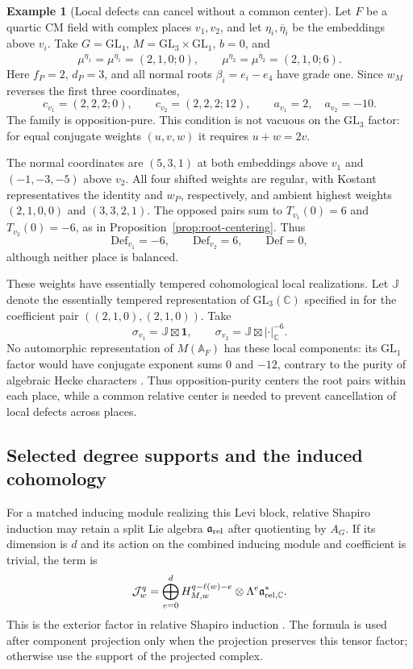 \documentclass[12pt]{amsart}
\numberwithin{equation}{section}
\theoremstyle{plain}
\theoremstyle{definition}
\newtheorem{example}[theorem]{Example}
\theoremstyle{remark}
\renewcommand{\bar}{\overline}
\newcommand{\C}{\mathbb C}
\newcommand{\GL}{\mathrm{GL}}
\newcommand{\Def}{\mathrm{Def}}
\begin{document}
\begin{example}[Local defects can cancel without a common center] \label{ex:defect-cancellation}
Let $F$ be a quartic CM field with complex places $v_1,v_2$, and let $\eta_i,\bar\eta_i$ be the embeddings above $v_i$. Take $G=\GL_4$, $M=\GL_3\times\GL_1$, $b=0$, and 
\[
 \mu^{\eta_1}=\mu^{\bar\eta_1}=(2,1,0;0),\qquad
 \mu^{\eta_2}=\mu^{\bar\eta_2}=(2,1,0;6).
\]
Here $f_P=2$, $d_P=3$, and all normal roots $\beta_i=e_i-e_4$ have grade one. Since $w_M$ reverses the first three coordinates, 
\[
 c_{v_1}=(2,2,2;0),\qquad c_{v_2}=(2,2,2;12),
 \qquad a_{v_1}=2,\quad a_{v_2}=-10.
\]
The family is opposition-pure. This condition is not vacuous on the $\GL_3$ factor: for equal conjugate weights $(u,v,w)$ it requires $u+w=2v$.

The normal coordinates are $(5,3,1)$ at both embeddings above $v_1$ and $(-1,-3,-5)$ above $v_2$. All four shifted weights are regular, with Kostant representatives the identity and $w_P$, respectively, and ambient highest weights $(2,1,0,0)$ and $(3,3,2,1)$. The opposed pairs sum to $T_{v_1}(0)=6$ and $T_{v_2}(0)=-6$, as in Proposition~\ref{prop:root-centering}. Thus 
\[
 \Def_{v_1}=-6,\qquad \Def_{v_2}=6,\qquad \Def=0,
\]
although neither place is balanced.

These weights have essentially tempered cohomological local realizations. Let $\mathbb J$ denote the essentially tempered representation of $\GL_3(\C)$ specified in \cite[(2.8)--(2.10), Prop.~2.13]{Raghuram2025} for the coefficient pair $((2,1,0),(2,1,0))$. Take 
\[
 \sigma_{v_1}=\mathbb J\boxtimes\mathbf1,\qquad
 \sigma_{v_2}=\mathbb J\boxtimes|\cdot|_{\C}^{-6}.
\]
No automorphic representation of $M(\mathbb A_F)$ has these local components: its $\GL_1$ factor would have conjugate exponent sums $0$ and $-12$, contrary to the purity of algebraic Hecke characters \cite[Lemma~17(ii)]{RaghuramHecke2022}. Thus opposition-purity centers the root pairs within each place, while a common relative center is needed to prevent cancellation of local defects across places.
\end{example}

\subsection{Selected degree supports and the induced cohomology}

For a matched inducing module realizing this Levi block, relative Shapiro induction may retain a split Lie algebra $\mathfrak a_{\rm rel}$ after quotienting by $A_G$. If its dimension is $d$ and its action on the combined inducing module and coefficient is trivial, the term is
\begin{equation}\label{eq:induced-piece}
 \mathcal J_w^q=\bigoplus_{e=0}^d
 H_{M,w}^{q-\ell(w)-e}\otimes
 \Lambda^e\mathfrak a_{{\rm rel},\C}^*.
\end{equation}
This is the exterior factor in relative Shapiro induction \cite[Ch.~III, Prop.~2.5(ii) and Thm.~3.3(ii)]{BorelWallach}. The formula is used after component projection only when the projection preserves this tensor factor; otherwise use the support of the projected complex.
\end{document}
